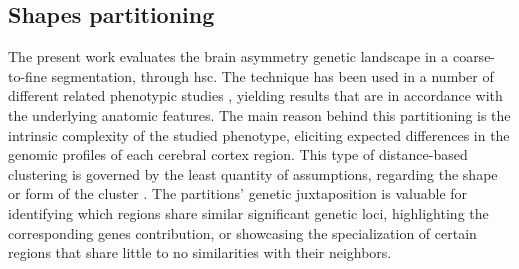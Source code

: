 \subsection{Shapes partitioning}
The present work evaluates the brain asymmetry genetic landscape in a coarse-to-fine segmentation, through \acf{hsc}. The technique has been used in a number of different related phenotypic studies \cite{Claes2018}\cite{Naqvi2021}, yielding results that are in accordance with the underlying anatomic features. The main reason behind this partitioning is the intrinsic complexity of the studied phenotype, eliciting expected differences in the genomic profiles of each cerebral cortex region. This type of distance-based clustering is governed by the least quantity of assumptions, regarding the shape or form of the cluster \cite{VonLuxburg2007}. The partitions' genetic juxtaposition is valuable for identifying which regions share similar significant genetic loci, highlighting the corresponding genes contribution, or showcasing the specialization of certain regions that share little to no similarities with their neighbors.

